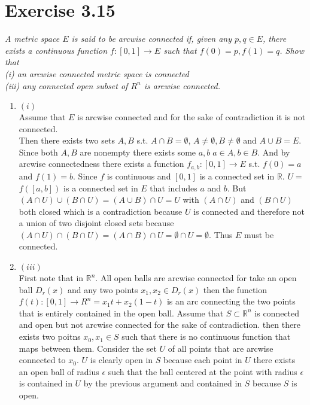 \documentclass{amsart}
\begin{document}
    \section{Exercise 3.15}
    \emph{A metric space $E$ is said to be arcwise connected if, given any $p,q \in E$, there exists
        a continuous function $f : [0,1] \rightarrow E$ such that $f(0) = p, f(1) = q$. Show that\\
        (i) an arcwise connected metric space is connected\\
        (iii) any connected open subset of $R^{n}$ is arcwise connected.
    }
    \begin{enumerate}
        \item $(i)$ \\
            Assume that $E$ is arcwise connected and for the sake of contradiction it is not connected.\\
            Then there exists two sets $A,B$ s.t. $A \cap B = \emptyset$, $A \ne \emptyset, B \ne \emptyset$ and $A \cup B = E$.
            Since both $A,B$ are nonempty there exists some $a,b \; a \in A, b \in B$. And by 
            arcwise connectedness there exists a function $f_{a,b} : [0,1] \rightarrow E$ s.t. $f(0) = a$ and $f(1) = b$.
            Since $f$ is continuous and $[0,1]$ is a connected set in $ \mathbb{R} $. $U =$$f([a,b])$ is a connected set in $E$ that includes
            $a$ and $b$. But  $(A \cap U) \cup ( B \cap U) = (A \cup B ) \cap U = U$ with $(A \cap U)$ and $(B \cap U)$ both closed which is 
            a contradiction because $U$ is connected and therefore not a union of two disjoint closed sets because $(A \cap U ) \cap (B \cap U) = (A \cap B) \cap U = \emptyset \cap U = \emptyset$. Thus  $E$ must be connected.
        \item $(iii)$ \\
            First note that in $ \mathbb{R}^{n}$. All open balls are arcwise connected for take an open ball $D_r(x)$ and any two points $x_1,x_2 \in D_r(x)$ then the function $f(t) : [0,1] \rightarrow R^{n} = x_1t + x_2(1-t)$ is an arc connecting the two points that is entirely
            contained in the open ball. Assume that $S \subset \mathbb{R}^{n}$ is connected and open but not arcwise connected for the sake of contradiction.
            then there exists two poitns $x_0,x_1 \in S$ such that there is no continuous function that maps between them. Consider the set $U$ of all points that are arcwise connected to $x_0$.
            $U$ is clearly open in $S$ because each point in $U$ there exists an open ball of radius $\epsilon $ such that the ball centered at the point with radius $\epsilon $ is contained in $U$ by the previous argument and contained in $S$ because $S$ is open.
$$
\end{enumerate}
\end{document}
